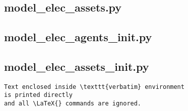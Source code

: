 
\subsection{model\_elec\_assets.py}



\subsection{model\_elec\_agents\_init.py}



\subsection{model\_elec\_assets\_init.py}





\begin{verbatim}
Text enclosed inside \texttt{verbatim} environment 
is printed directly 
and all \LaTeX{} commands are ignored.
\end{verbatim}

